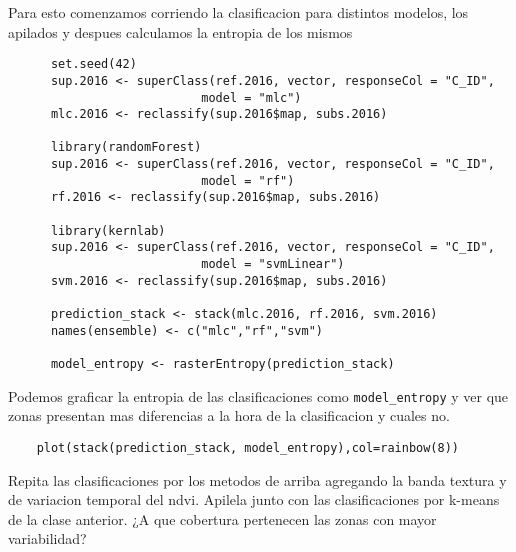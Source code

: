\begin{exa}
  Para esto comenzamos corriendo la clasificacion para distintos modelos, los apilados y
  despues calculamos la entropia de los mismos

  \begin{lstlisting}
      set.seed(42)
      sup.2016 <- superClass(ref.2016, vector, responseCol = "C_ID",
                           model = "mlc")
      mlc.2016 <- reclassify(sup.2016$map, subs.2016)

      library(randomForest)
      sup.2016 <- superClass(ref.2016, vector, responseCol = "C_ID",
                           model = "rf")
      rf.2016 <- reclassify(sup.2016$map, subs.2016)

      library(kernlab)
      sup.2016 <- superClass(ref.2016, vector, responseCol = "C_ID",
                           model = "svmLinear")
      svm.2016 <- reclassify(sup.2016$map, subs.2016)

      prediction_stack <- stack(mlc.2016, rf.2016, svm.2016)
      names(ensemble) <- c("mlc","rf","svm")

      model_entropy <- rasterEntropy(prediction_stack)
  \end{lstlisting}

  Podemos graficar la entropia de las clasificaciones como \verb|model_entropy|
  y ver que zonas presentan mas diferencias a la hora de la clasificacion y cuales no.
  \begin{lstlisting}
    plot(stack(prediction_stack, model_entropy),col=rainbow(8))
  \end{lstlisting}
\end{exa}

\begin{act}
  Repita las clasificaciones por los metodos de arriba agregando la banda
  textura y de variacion temporal del ndvi. Apilela junto con las clasificaciones por
  k-means de la clase anterior. ¿A que cobertura pertenecen las zonas con mayor
  variabilidad?
\end{act}
